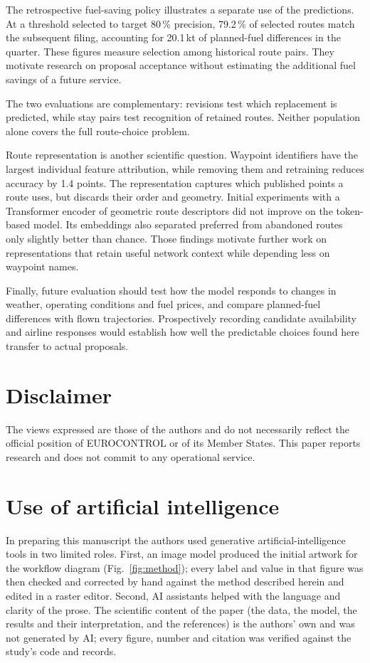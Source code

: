 \documentclass[a4paper,conference]{IEEEtran}
\begin{document}
The retrospective fuel-saving policy illustrates a separate use of the
predictions. At a threshold selected to target 80\,\% precision,
79.2\,\% of selected routes match the subsequent filing, accounting for
20.1\,kt of planned-fuel differences in the quarter. These figures
measure selection among historical route pairs. They motivate research
on proposal acceptance without estimating the additional fuel savings
of a future service.

The two evaluations are complementary: revisions test which replacement
is predicted, while stay pairs test recognition of retained routes.
Neither population alone covers the full route-choice problem.

Route representation is another scientific question. Waypoint identifiers
have the largest individual feature attribution, while removing them and
retraining reduces accuracy by 1.4 points. The representation captures
which published points a route uses, but discards their order and
geometry. Initial experiments with a Transformer encoder of geometric
route descriptors did not improve on the token-based model. Its
embeddings also separated preferred from abandoned routes only slightly
better than chance. Those findings motivate further work on representations
that retain useful network context while depending less on waypoint names.

Finally, future evaluation should test how the model responds to changes
in weather, operating conditions and fuel prices, and compare planned-fuel
differences with flown trajectories. Prospectively recording candidate
availability and airline responses would establish how well the
predictable choices found here transfer to actual proposals.

\section*{Disclaimer}
The views expressed are those of the authors and do not necessarily reflect
the official position of EUROCONTROL or of its Member States. This paper
reports research and does not commit to any operational service.

\section*{Use of artificial intelligence}
In preparing this manuscript the authors used generative artificial-intelligence
tools in two limited roles. First, an image model produced the initial artwork
for the workflow diagram (Fig.~\ref{fig:method}); every label and value in that
figure was then checked and corrected by hand against the method described
herein and edited in a raster editor. Second, AI assistants helped with the
language and clarity of the prose. The scientific content of the paper (the
data, the model, the results and their interpretation, and the references) is
the authors' own and was not generated by AI; every figure, number and citation
was verified against the study's code and records.

{\footnotesize


}
\end{document}
